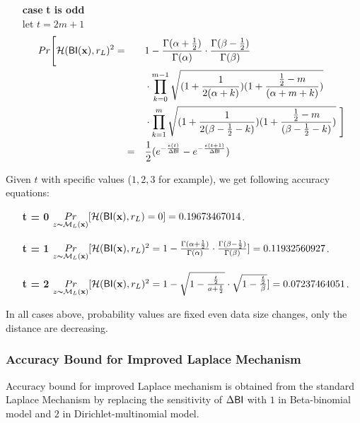\documentclass{article}
\begin{document}
\begin{itemize}
  \item[\textbf{case}] \textbf{t is odd}\\
  let $t = 2 m + 1$
  \begin{align*}
  Pr\Bigg[ \mathcal{H}(\mathsf{BI}(\textbf{x}), r_L )^2 =
  \qquad &
  1 - \frac{\Gamma(\alpha+\frac{1}{2})}{\Gamma(\alpha)} \cdot
\frac{\Gamma(\beta - \frac{1}{2})}{\Gamma(\beta)}\\
\qquad &\cdot 
  \prod_{k = 0}^{m-1}
  \sqrt{(1 + \frac{1}{2(\alpha + k)})
  (1 + \frac{\frac{1}{2} - m}{(\alpha + m  + k)})
  } \\
  \qquad & \cdot 
  \prod_{k = 1}^{m} 
  \sqrt{(1 + \frac{1}{2(\beta - \frac{1}{2}- k)})(1 + \frac{\frac{1}{2} - m}{(\beta - \frac{1}{2}- k)})}\ \Bigg] \\
  = \quad & \frac{1}{2} (e^{- \frac{\epsilon (t)}{\Delta \mathsf{BI}}} - e^{- \frac{\epsilon (t + 1)}{\Delta \mathsf{BI}}})\\
  \end{align*}

\end{itemize}

Given $t$ with specific values ($1, 2, 3$ for example), we get following accuracy equations:

\begin{itemize}
  \item[\textbf{t = 0}] $\underset{z \thicksim \mathcal{M}_L(\textbf{x})}{Pr}[\mathcal{H}(\mathsf{BI}(\textbf{x}), r_L ) = 0] = 0.19673467014$.
  \item[\textbf{t = 1}]
  $\underset{z \thicksim \mathcal{M}_L(\textbf{x})}{Pr}[\mathcal{H}(\mathsf{BI}(\textbf{x}), r_L )^2 = 1 - \frac{\Gamma(\alpha+\frac{1}{2})}{\Gamma(\alpha)} \cdot
  \frac{\Gamma(\beta - \frac{1}{2})}{\Gamma(\beta)} ] = 0.11932560927$. 
  \item[\textbf{t = 2}]$\underset{z \thicksim \mathcal{M}_L(\textbf{x})}{Pr}[\mathcal{H}(\mathsf{BI}(\textbf{x}), r_L )^2 = 1 - 
  \sqrt{1 - \frac{\frac{t}{2}}{a + \frac{t}{2}}}
  \cdot
  \sqrt{1 - \frac{\frac{t}{2}}{\beta}}] = 0.07237464051$.
\end{itemize}
In all cases above, probability values are fixed even data size changes, only the distance are decreasing.

\subsubsection{Accuracy Bound for Improved Laplace Mechanism}
\label{subsec_accuracy_lap}
Accuracy bound for improved Laplace mechanism is obtained from the standard Laplace Mechanism by replacing the sensitivity of $\Delta \mathsf{BI}$ with $1$ in Beta-binomial model and $2$ in Dirichlet-multinomial model.
\end{document}
